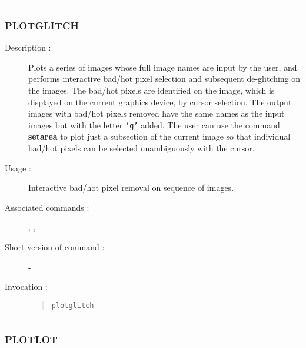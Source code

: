 \hrule 
\subsubsection*{\label{PLOTGLITCH}PLOTGLITCH}

\begin{description}

\item[Description :] Plots a series of images whose full image names
are input by the user, and performs interactive bad/hot pixel selection
and subsequent de-glitching on the images.  The bad/hot pixels are
identified on the image, which is displayed on the current graphics
device, by cursor selection.  The output images with bad/hot pixels
removed have the same names as the input images but with the letter {\tt `g'}
added.  The user can use the command {\bf setarea} to plot just a subsection
of the current image so that individual bad/hot pixels can be selected
unambiguously with the cursor.

\item[Usage :] Interactive bad/hot pixel removal on sequence of images.
\item[Associated commands :] {\tt {}}, 
{\tt {}}, {\tt {}}
\item[Short version of command :] -
\item[Invocation :]

\begin{quote}{\tt  plotglitch }\end{quote}

\end{description}

\hrule 
\subsubsection*{\label{PLOTLOT}PLOTLOT}

